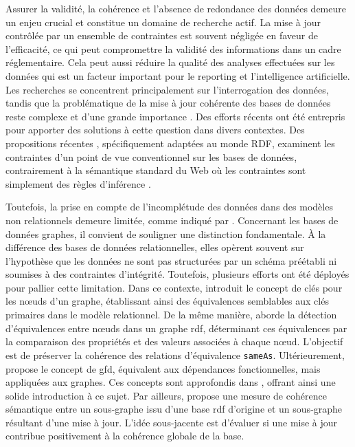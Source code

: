 Assurer la validité, la cohérence et l'absence de redondance des données demeure un enjeu crucial et constitue un domaine de recherche actif.
La mise à jour contrôlée par un ensemble de contraintes est souvent négligée en faveur de l'efficacité, ce qui peut compromettre la validité des informations dans un cadre réglementaire.
Cela peut aussi réduire la qualité des analyses effectuées sur les données qui est un facteur important pour le reporting et l'intelligence artificielle.
Les recherches se concentrent principalement sur l'interrogation des données, tandis que la problématique de la mise à jour cohérente des bases de données reste complexe et d'une grande importance \cite{halfeld-ferrariUpdateRulesDatalog1998,scheweLimitationsRuleTriggering1998,linkArithmeticTheoryConsistency2002}.
Des efforts récents ont été entrepris pour apporter des solutions à cette question dans divers contextes.
Des propositions récentes \cite{akhtarConstraintsRDF2011,flourisFormalFoundationsRDF2013,halfeld-ferrariRDFUpdatesConstraints2017,halfeld-ferrariUpdatingRDFDatabases2017}, spécifiquement adaptées au monde RDF, examinent les contraintes d'un point de vue conventionnel sur les bases de données, contrairement à la sémantique standard du Web où les contraintes sont simplement des règles d'inférence \cite{lausenSPARQLingConstraintsRDF2008,gottlobOntologicalQueriesRewriting2011,patel-schneiderUsingDescriptionLogics2015}.

Toutefois, la prise en compte de l'incomplétude des données dans des modèles non relationnels demeure limitée, comme indiqué par \cite{sirangeloRepresentingQueryingIncomplete2014}.
Concernant les bases de données graphes, il convient de souligner une distinction fondamentale.
À la différence des bases de données relationnelles, elles opèrent souvent sur l'hypothèse que les données ne sont pas structurées par un schéma préétabli ni soumises à des contraintes d'intégrité.
Toutefois, plusieurs efforts ont été déployés pour pallier cette limitation.
Dans ce contexte, \cite{fanKeysGraphs2015} introduit le concept de clés pour les nœuds d'un graphe, établissant ainsi des équivalences semblables aux clés primaires dans le modèle relationnel.
De la même manière, \cite{raadDetectionLiensIdentite2018} aborde la détection d'équivalences entre nœuds dans un graphe \gls{rdf}, déterminant ces équivalences par la comparaison des propriétés et des valeurs associées à chaque nœud.
L'objectif est de préserver la cohérence des relations d'équivalence \verb|sameAs|.
Ultérieurement, \cite{fanDependenciesGraphs2019} propose le concept de \gls{gfd}, équivalent aux dépendances fonctionnelles, mais appliquées aux graphes.
Ces concepts sont approfondis dans \cite{anglesPgkeysKeysProperty2021,bonifatiQueryingGraphs2018}, offrant ainsi une solide introduction à ce sujet.
Par ailleurs, \cite{maillotConsistencyEvaluationRDF2014} propose une mesure de cohérence sémantique entre un sous-graphe issu d'une base \gls{rdf} d'origine et un sous-graphe résultant d'une mise à jour.
L'idée sous-jacente est d'évaluer si une mise à jour contribue positivement à la cohérence globale de la base.


